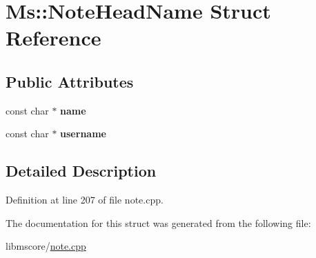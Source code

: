 \hypertarget{struct_ms_1_1_note_head_name}{}\section{Ms\+:\+:Note\+Head\+Name Struct Reference}
\label{struct_ms_1_1_note_head_name}
\subsection*{Public Attributes}
\begin{DoxyCompactItemize}
\item 
\mbox{\label{struct_ms_1_1_note_head_name_ac1266fc3f5369014c70b763110c6476c}} 
const char $\ast$ {\bfseries name}
\item 
\mbox{\label{struct_ms_1_1_note_head_name_ae34aa6884b3f01872ed04175f6097939}} 
const char $\ast$ {\bfseries username}
\end{DoxyCompactItemize}


\subsection{Detailed Description}


Definition at line 207 of file note.\+cpp.



The documentation for this struct was generated from the following file\+:\begin{DoxyCompactItemize}
\item 
libmscore/\hyperlink{note_8cpp}{note.\+cpp}\end{DoxyCompactItemize}
